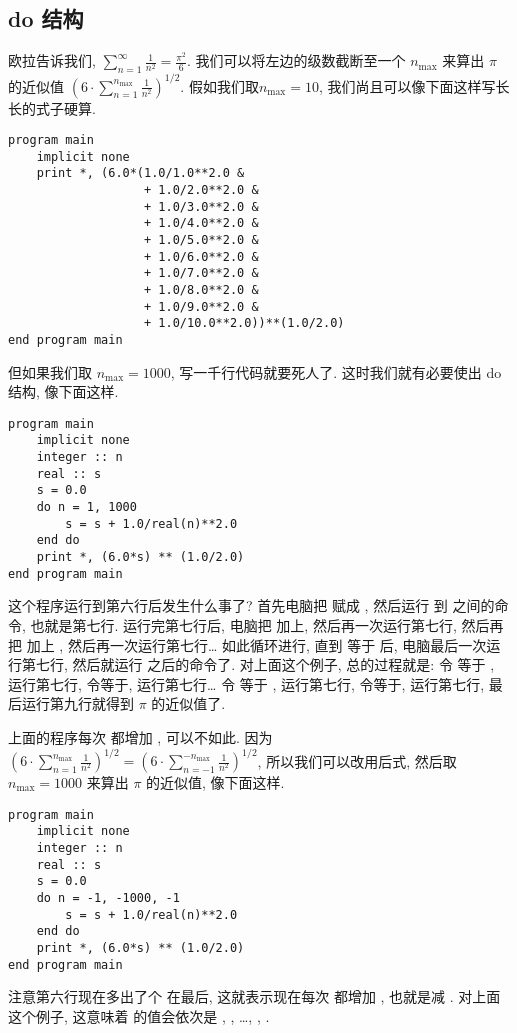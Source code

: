 \subsection{do 结构}\label{do_construct}

欧拉告诉我们, $
    \sum_{n=1}^{\infty} \frac{1}{n^2} = \frac{\pi^2}{6}$.
我们可以将左边的级数截断至一个 $n_{\text{max}}$ 来算出 $\pi$ 的近似值 $(6\cdot\sum_{n=1}^{n_{\text{max}}} \frac{1}{n^2})^{1/2}$. 假如我们取$n_{\text{max}}=10$, 我们尚且可以像下面这样写长长的式子硬算.
\begin{lstlisting}
program main
    implicit none
    print *, (6.0*(1.0/1.0**2.0 &
                   + 1.0/2.0**2.0 &
                   + 1.0/3.0**2.0 &
                   + 1.0/4.0**2.0 &
                   + 1.0/5.0**2.0 &
                   + 1.0/6.0**2.0 &
                   + 1.0/7.0**2.0 &
                   + 1.0/8.0**2.0 &
                   + 1.0/9.0**2.0 &
                   + 1.0/10.0**2.0))**(1.0/2.0)
end program main
\end{lstlisting}
但如果我们取 $n_{\text{max}}=1000$, 写一千行代码就要死人了. 这时我们就有必要使出 do 结构, 像下面这样.
\begin{lstlisting}
program main
    implicit none
    integer :: n
    real :: s
    s = 0.0
    do n = 1, 1000
        s = s + 1.0/real(n)**2.0
    end do
    print *, (6.0*s) ** (1.0/2.0)
end program main
\end{lstlisting}
这个程序运行到第六行后发生什么事了? 首先电脑把  赋成 , 然后运行  到  之间的命令, 也就是第七行. 运行完第七行后, 电脑把  加上, 然后再一次运行第七行, 然后再把  加上 , 然后再一次运行第七行\dots{} 如此循环进行, 直到  等于  后, 电脑最后一次运行第七行, 然后就运行  之后的命令了. 对上面这个例子, 总的过程就是: 令  等于 , 运行第七行, 令等于, 运行第七行\dots{} 令  等于 , 运行第七行, 令等于, 运行第七行, 最后运行第九行就得到 $\pi$ 的近似值了.

上面的程序每次  都增加 , 可以不如此. 因为 $(6\cdot\sum_{n=1}^{n_{\text{max}}} \frac{1}{n^2})^{1/2} = (6\cdot\sum_{n=-1}^{-n_{\text{max}}} \frac{1}{n^2})^{1/2}$, 所以我们可以改用后式, 然后取 $n_{\text{max}}=1000$ 来算出 $\pi$ 的近似值, 像下面这样.
\begin{lstlisting}
program main
    implicit none
    integer :: n
    real :: s
    s = 0.0
    do n = -1, -1000, -1
        s = s + 1.0/real(n)**2.0
    end do
    print *, (6.0*s) ** (1.0/2.0)
end program main
\end{lstlisting}
注意第六行现在多出了个  在最后, 这就表示现在每次  都增加 , 也就是减 . 对上面这个例子, 这意味着  的值会依次是 , , \dots{}, , .


